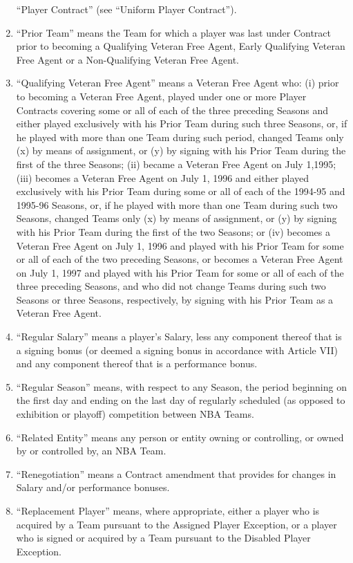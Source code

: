 \documentclass[
]{book}
\begin{document}
\begin{enumerate}
  ``Player Contract'' (see ``Uniform Player Contract'').
\item
  ``Prior Team'' means the Team for which a player was last under Contract prior to becoming a Qualifying Veteran Free Agent, Early Qualifying Veteran Free Agent or a Non-Qualifying Veteran Free Agent.
\item
  ``Qualifying Veteran Free Agent'' means a Veteran Free Agent who: (i) prior to becoming a Veteran Free Agent, played under one or more Player Contracts covering some or all of each of the three preceding Seasons and either played exclusively with his Prior Team during such three Seasons, or, if he played with more than one Team during such period, changed Teams only (x) by means of assignment, or (y) by signing with his Prior Team during the first of the three Seasons; (ii) became a Veteran Free Agent on July 1,1995; (iii) becomes a Veteran Free Agent on July 1, 1996 and either played exclusively with his Prior Team during some or all of each of the 1994-95 and 1995-96 Seasons, or, if he played with more than one Team during such two Seasons, changed Teams only (x) by means of assignment, or (y) by signing with his Prior Team during the first of the two Seasons; or (iv) becomes a Veteran Free Agent on July 1, 1996 and played with his Prior Team for some or all of each of the two preceding Seasons, or becomes a Veteran Free Agent on July 1, 1997 and played with his Prior Team for some or all of each of the three preceding Seasons, and who did not change Teams during such two Seasons or three Seasons, respectively, by signing with his Prior Team as a Veteran Free Agent.
\item
  ``Regular Salary'' means a player's Salary, less any component thereof that is a signing bonus (or deemed a signing bonus in accordance with Article VII) and any component thereof that is a performance bonus.
\item
  ``Regular Season'' means, with respect to any Season, the period beginning on the first day and ending on the last day of regularly scheduled (as opposed to exhibition or playoff) competition between NBA Teams.
\item
  ``Related Entity'' means any person or entity owning or controlling, or owned by or controlled by, an NBA Team.
\item
  ``Renegotiation'' means a Contract amendment that provides for changes in Salary and/or performance bonuses.
\item
  ``Replacement Player'' means, where appropriate, either a player who is acquired by a Team pursuant to the Assigned Player Exception, or a player who is signed or acquired by a Team pursuant to the Disabled Player Exception.

\end{enumerate}
\end{document}
